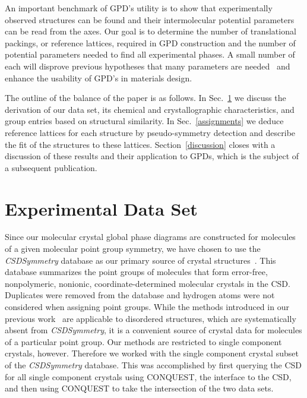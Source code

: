 \documentclass[preprint]{revtex4}              %
\begin{document}
An important benchmark of GPD's utility is to show that
experimentally observed structures can be found and their
intermolecular potential parameters can be read from the axes. Our
goal is to determine the number of translational packings, or
reference lattices, required in GPD construction and the number of
potential parameters needed to find all experimental phases.  A
small number of each will disprove previous hypotheses that many
parameters are needed~\cite{Briels80} and enhance the usability of
GPD's in materials design.

The outline of the balance of the paper is as follows. In
Sec.~\ref{Reference_Phases} we discuss the derivation of our data
set, its chemical and crystallographic characteristics, and group
entries based on structural similarity. In Sec.~\ref{assignments} we
deduce reference lattices for each structure by pseudo-symmetry
detection and describe the fit of the structures to these lattices.
Section~\ref{discussion} closes with a discussion of these results
and their application to GPDs, which is the subject of a subsequent
publication.~\cite{Keith06b}

\section{Experimental Data Set}
\label{Reference_Phases}

Since our molecular crystal global phase diagrams are constructed
for molecules of a given molecular point group symmetry, we have
chosen to use the \emph{CSDSymmetry} database as our primary source
of crystal structures~\cite{Yao02}. This database summarizes the
point groups of molecules that form error-free, nonpolymeric,
nonionic, coordinate-determined molecular crystals in the CSD.
Duplicates were removed from the database and hydrogen atoms were
not considered when assigning point groups. While the methods
introduced in our previous work~\cite{Mettes04} are applicable to
disordered structures, which are systematically absent from
\emph{CSDSymmetry}, it is a convenient source of crystal data for
molecules of a particular point group. Our methods are restricted to
single component crystals, however. Therefore we worked with the
single component crystal subset of the \emph{CSDSymmetry} database.
This was accomplished by first querying the CSD for all single
component crystals using {C\small ONQUEST}, the interface to the
CSD, and then using {C\small ONQUEST} to take the intersection of
the two data sets.
\end{document}
